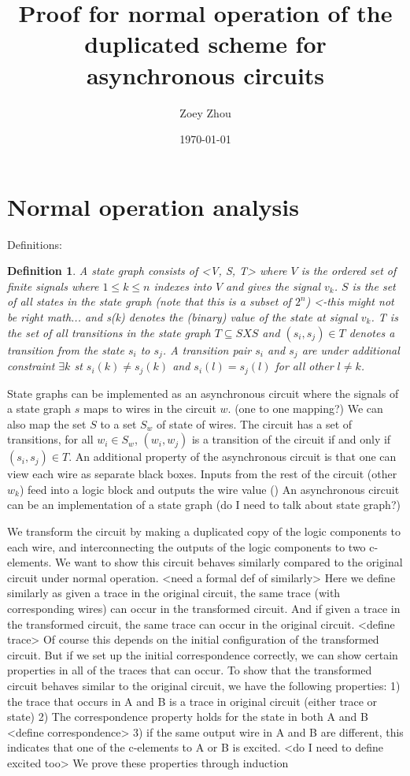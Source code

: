 \documentclass{article}
\title{Proof for normal operation of the duplicated scheme for asynchronous circuits}
\author{Zoey Zhou}
\date{\today}
\newtheorem*{definition}{Definition}
\begin{document}
\section{Normal operation analysis}
Definitions:  
\begin{definition}A state graph consists of <V, S, T> where $V$ is the ordered set of finite signals where $1\leq k \leq n$ indexes into $V$ and gives the signal $v_k$.  $S$ is the set of all states in the state graph (note that this is a subset of $2^n$) <-this might not be right math...
and s(k) denotes the (binary) value of the state at signal $v_k$.  T is the set of all transitions in the state graph $T \subseteq S X S$ and $(s_i, s_j) \in T$ denotes a transition from the state $s_i$ to $s_j$.  A transition pair $s_i$ and $s_j$ are under additional constraint 
$\exists k$ st $s_i(k)\neq s_j(k)$ and $s_i(l)=s_j(l)$ for all other $l \neq k$.\end{definition}
\newline
State graphs can be implemented as an asynchronous circuit where the signals of a state graph $s$ maps to wires in the circuit $w$. (one to one mapping?)  We can also map the set $S$ to a set $S_w$ of state of wires. The circuit has a set of transitions, for all $w_i \in S_w$, 
$(w_i, w_j)$ is a transition of the circuit if and only if $(s_i, s_j) \in T$.  An additional property of the asynchronous circuit is that one can view each wire as separate black boxes.  Inputs from the rest of the circuit (other $w_k$) feed into a logic block and outputs the wire value ()
An asynchronous circuit can be an implementation of a state graph (do I need to talk about state graph?)

We transform the circuit by making a duplicated copy of the logic components to each wire, and interconnecting the outputs of the logic components to two c-elements.  We want to show this circuit behaves similarly
compared to the original circuit under normal operation.  <need a formal def of similarly> Here we define similarly as given a trace in the original circuit, the same trace (with corresponding wires) can occur in the transformed circuit.  And if given a trace
in the transformed circuit, the same trace can occur in the original circuit. <define trace>  Of course this depends on the initial configuration of the transformed circuit.  But if we set up the initial correspondence correctly, we can show
certain properties in all of the traces that can occur.  
\newline
To show that the transformed circuit behaves similar to the original circuit, we have the following properties:
1)  the trace that occurs in A and B is a trace in original circuit (either trace or state)
2)  The correspondence property holds for the state in both A and B <define correspondence>
3)  if the same output wire in A and B are different, this indicates that one of the c-elements to A or B is excited. <do I need to define excited too>
\newline
We prove these properties through induction
\end{document}
